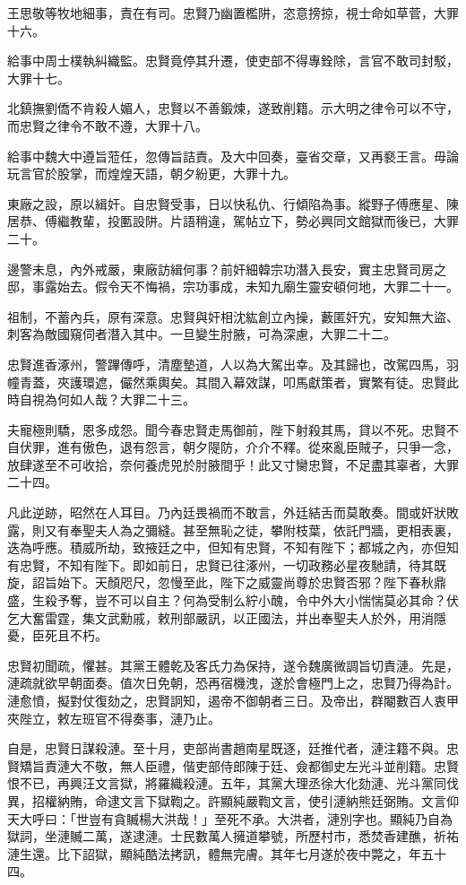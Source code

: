 \begin{pinyinscope}
王思敬等牧地細事，責在有司。忠賢乃幽置檻阱，恣意搒掠，視士命如草菅，大罪十六。

給事中周士樸執糾織監。忠賢竟停其升遷，使吏部不得專銓除，言官不敢司封駁，大罪十七。

北鎮撫劉僑不肯殺人媚人，忠賢以不善鍛煉，遂致削籍。示大明之律令可以不守，而忠賢之律令不敢不遵，大罪十八。

給事中魏大中遵旨蒞任，忽傳旨詰責。及大中回奏，臺省交章，又再褻王言。毋論玩言官於股掌，而煌煌天語，朝夕紛更，大罪十九。

東廠之設，原以緝奸。自忠賢受事，日以快私仇、行傾陷為事。縱野子傅應星、陳居恭、傅繼教輩，投匭設阱。片語稍違，駕帖立下，勢必興同文館獄而後已，大罪二十。

邊警未息，內外戒嚴，東廠訪緝何事？前奸細韓宗功潛入長安，實主忠賢司房之邸，事露始去。假令天不悔禍，宗功事成，未知九廟生靈安頓何地，大罪二十一。

祖制，不蓄內兵，原有深意。忠賢與奸相沈紘創立內操，藪匿奸宄，安知無大盜、刺客為敵國窺伺者潛入其中。一旦變生肘腋，可為深慮，大罪二十二。

忠賢進香涿州，警蹕傳呼，清塵墊道，人以為大駕出幸。及其歸也，改駕四馬，羽幢青蓋，夾護環遮，儼然乘輿矣。其間入幕效謀，叩馬獻策者，實繁有徒。忠賢此時自視為何如人哉？大罪二十三。

夫寵極則驕，恩多成怨。聞今春忠賢走馬御前，陛下射殺其馬，貸以不死。忠賢不自伏罪，進有傲色，退有怨言，朝夕隄防，介介不釋。從來亂臣賊子，只爭一念，放肆遂至不可收拾，奈何養虎兕於肘腋間乎！此又寸臠忠賢，不足盡其辜者，大罪二十四。

凡此逆跡，昭然在人耳目。乃內廷畏禍而不敢言，外廷結舌而莫敢奏。間或奸狀敗露，則又有奉聖夫人為之彌縫。甚至無恥之徒，攀附枝葉，依託門牆，更相表裏，迭為呼應。積威所劫，致掖廷之中，但知有忠賢，不知有陛下；都城之內，亦但知有忠賢，不知有陛下。即如前日，忠賢已往涿州，一切政務必星夜馳請，待其既旋，詔旨始下。天顏咫尺，忽慢至此，陛下之威靈尚尊於忠賢否邪？陛下春秋鼎盛，生殺予奪，豈不可以自主？何為受制么紵小醜，令中外大小惴惴莫必其命？伏乞大奮雷霆，集文武勳戚，敕刑部嚴訊，以正國法，并出奉聖夫人於外，用消隱憂，臣死且不朽。

忠賢初聞疏，懼甚。其黨王體乾及客氏力為保持，遂令魏廣微調旨切責漣。先是，漣疏就欲早朝面奏。值次日免朝，恐再宿機洩，遂於會極門上之，忠賢乃得為計。漣愈憤，擬對仗復劾之，忠賢詗知，遏帝不御朝者三日。及帝出，群閹數百人衷甲夾陛立，敕左班官不得奏事，漣乃止。

自是，忠賢日謀殺漣。至十月，吏部尚書趙南星既逐，廷推代者，漣注籍不與。忠賢矯旨責漣大不敬，無人臣禮，偕吏部侍郎陳于廷、僉都御史左光斗並削籍。忠賢恨不已，再興汪文言獄，將羅織殺漣。五年，其黨大理丞徐大化劾漣、光斗黨同伐異，招權納賄，命逮文言下獄鞫之。許顯純嚴鞫文言，使引漣納熊廷弼賄。文言仰天大呼曰：「世豈有貪贓楊大洪哉！」至死不承。大洪者，漣別字也。顯純乃自為獄詞，坐漣贓二萬，遂逮漣。士民數萬人擁道攀號，所歷村市，悉焚香建醮，祈祐漣生還。比下詔獄，顯純酷法拷訊，體無完膚。其年七月遂於夜中斃之，年五十四。


\end{pinyinscope}
